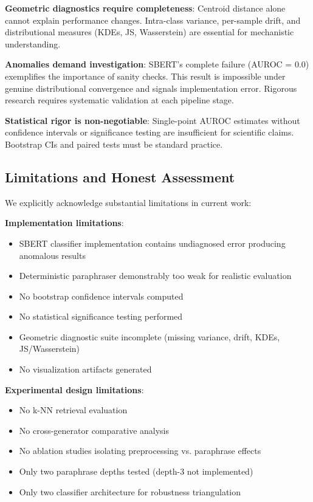 \documentclass[conference]{IEEEtran}
\begin{document}
\textbf{Geometric diagnostics require completeness}: Centroid distance alone cannot explain performance changes. Intra-class variance, per-sample drift, and distributional measures (KDEs, JS, Wasserstein) are essential for mechanistic understanding.

\textbf{Anomalies demand investigation}: SBERT's complete failure (AUROC = 0.0) exemplifies the importance of sanity checks. This result is impossible under genuine distributional convergence and signals implementation error. Rigorous research requires systematic validation at each pipeline stage.

\textbf{Statistical rigor is non-negotiable}: Single-point AUROC estimates without confidence intervals or significance testing are insufficient for scientific claims. Bootstrap CIs and paired tests must be standard practice.

\subsection{Limitations and Honest Assessment}
\label{sec:limitations}

We explicitly acknowledge substantial limitations in current work:

\textbf{Implementation limitations}:
\begin{itemize}
    \item SBERT classifier implementation contains undiagnosed error producing anomalous results
    \item Deterministic paraphraser demonstrably too weak for realistic evaluation
    \item No bootstrap confidence intervals computed
    \item No statistical significance testing performed
    \item Geometric diagnostic suite incomplete (missing variance, drift, KDEs, JS/Wasserstein)
    \item No visualization artifacts generated
\end{itemize}

\textbf{Experimental design limitations}:
\begin{itemize}
    \item No k-NN retrieval evaluation
    \item No cross-generator comparative analysis
    \item No ablation studies isolating preprocessing vs. paraphrase effects
    \item Only two paraphrase depths tested (depth-3 not implemented)
    \item Only two classifier architecture for robustness triangulation
\end{itemize}
\end{document}

